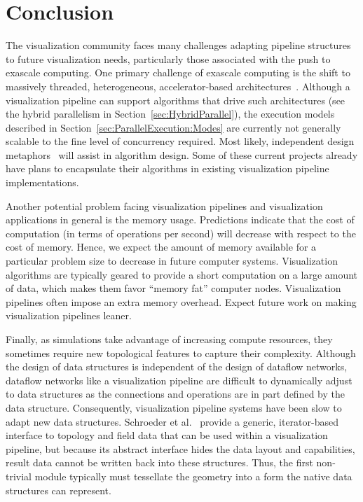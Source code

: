 \documentclass[journal,twocolumn,10pt,letterpaper,twoside]{IEEEtran}
\newcommand*{\lcite}[1]{~\cite{#1}}
\newcommand*{\scite}[1]{~\cite{#1}}
\newcommand{\etal}{et al.}
\begin{document}
\section{Conclusion}
\label{sec:Conclusion}

The visualization community faces many challenges adapting pipeline
structures to future visualization needs, particularly those associated
with the push to exascale computing.  One primary challenge of exascale
computing is the shift to massively threaded, heterogeneous,
accelerator-based architectures\lcite{ScientificDiscoveryExascale2011}.
Although a visualization pipeline can support algorithms that drive such
architectures (see the hybrid parallelism in
Section~\ref{sec:HybridParallel}), the execution models described in
Section~\ref{sec:ParallelExecution:Modes} are currently not generally
scalable to the fine level of concurrency required.  Most likely,
independent design metaphors\lcite{PISTON,Moreland2011:LDAV,EAVL} will
assist in algorithm design.  Some of these current projects already have
plans to encapsulate their algorithms in existing visualization pipeline
implementations.

Another potential problem facing visualization pipelines and visualization
applications in general is the memory usage.  Predictions indicate that the
cost of computation (in terms of operations per second) will decrease with
respect to the cost of memory.  Hence, we expect the amount of memory
available for a particular problem size to decrease in future computer
systems.  Visualization algorithms are typically geared to provide a short
computation on a large amount of data, which makes them favor ``memory
fat'' computer nodes.  Visualization pipelines often impose an extra memory
overhead.  Expect future work on making visualization pipelines leaner.

Finally, as simulations take advantage of increasing compute resources,
they sometimes require new topological features to capture their
complexity.  Although the design of data structures is independent of the
design of dataflow networks, dataflow networks like a visualization
pipeline are difficult to dynamically adjust to data structures as the
connections and operations are in part defined by the data structure.
Consequently, visualization pipeline systems have been slow to adapt new
data structures.  Schroeder \etal\scite{Schroeder2006} provide a generic,
iterator-based interface to topology and field data that can be used within
a visualization pipeline, but because its abstract interface hides the data
layout and capabilities, result data cannot be written back into these
structures.  Thus, the first non-trivial module typically must tessellate
the geometry into a form the native data structures can represent.
\end{document}
